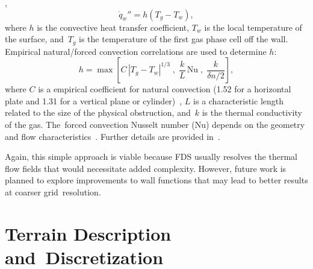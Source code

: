\documentclass[atmosphere,article,accept,moreauthors,pdftex]{Definitions/mdpi}
\begin{document}
,
\begin{equation}
\dot{q}_w'' = h (T_g - T_w),
\end{equation}
where $h$ is the convective heat transfer coefficient, $T_w$ is the local temperature of the surface, and~$T_g$ is the temperature of the first gas phase cell off the wall.  Empirical natural/forced convection correlations are used to determine $h$:
\begin{equation}
h = \max \left[C\, |T_g-T_w|^{1/3} \; , \;
\frac{k}{L} \, \mathrm{Nu} \; , \;
\frac{k}{\delta n/2} \right],
\label{eq:qconv}
\end{equation}
where $C$ is a empirical coefficient for natural convection (1.52 for a horizontal plate and 1.31 for a vertical plane or cylinder)~\cite{Holman:1}, $L$ is a characteristic length related to the size of the physical obstruction, and~$k$ is the thermal conductivity of the gas. The~forced convection Nusselt number (Nu) depends on the geometry and flow characteristics~\cite{Holman:1,Incropera:1}.  Further details are provided in~\cite{FDS_MathVal_Guides}.

Again, this simple approach is viable because FDS usually resolves the thermal flow fields that would necessitate added complexity.  However, future work is planned to explore improvements to wall functions that may lead to better results at coarser grid~resolution.


\section{Terrain Description and~Discretization} \label{sec:terraindisc}
\end{document}
